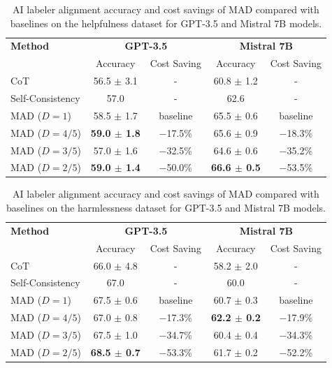 \documentclass[11pt]{article}
\begin{document}
\begin{table}
  \centering
  \begin{tabular}{l|cc|cc}
    \hline
     \textbf{Method} & \multicolumn{2}{c|}{\textbf{GPT-3.5}} & \multicolumn{2}{c}{\textbf{Mistral 7B}} \\
     & Accuracy & Cost Saving & Accuracy & Cost Saving \\
    \hline
    CoT & 56.5 $\pm$ 3.1 & - & 60.8 $\pm$ 1.2  & - \\
    Self-Consistency  & 57.0 & - & 62.6 & - \\
    \hline
    MAD ($D=1$) & 58.5 $\pm$ 1.7 & baseline & 65.5 $\pm$ 0.6 & baseline \\
    MAD ($D=4/5$) & \textbf{59.0 $\pm$ 1.8} & $-$17.5\% & 65.6 $\pm$ 0.9 & $-$18.3\% \\
    MAD ($D=3/5$) & 57.0 $\pm$ 1.6 & $-$32.5\% & 64.6 $\pm$ 0.6 & $-$35.2\% \\
    MAD ($D=2/5$) & \textbf{59.0 $\pm$ 1.4} & $-$50.0\% & \textbf{66.6 $\pm$ 0.5} & $-$53.5\% \\
    \hline
  \end{tabular}
\caption{AI labeler alignment accuracy and cost savings of MAD compared with baselines on the helpfulness dataset for GPT-3.5 and Mistral 7B models.}
\label{table:helpfulness}
\end{table}

\begin{table}
  \centering
  \begin{tabular}{l|cc|cc}
    \hline
     \textbf{Method} & \multicolumn{2}{c|}{\textbf{GPT-3.5}} & \multicolumn{2}{c}{\textbf{Mistral 7B}} \\
     & Accuracy & Cost Saving & Accuracy & Cost Saving \\
    \hline
    CoT & 66.0 $\pm$ 4.8 & - & 58.2 $\pm$ 2.0 & - \\
    Self-Consistency  & 67.0 & - & 60.0 & - \\
    \hline
    MAD ($D=1$)    & 67.5 $\pm$ 0.6 & baseline & 60.7 $\pm$ 0.3 & baseline \\
    MAD ($D=4/5$)  & 67.0 $\pm$ 0.8 &  $-$17.3\% & \textbf{62.2 $\pm$ 0.2} & $-$17.9\% \\
    MAD ($D=3/5$)  & 67.5 $\pm$ 1.0 & $-$34.7\% & 60.4 $\pm$ 0.4 & $-$34.3\% \\
    MAD ($D=2/5$)  & \textbf{68.5 $\pm$ 0.7} & $-$53.3\% & 61.7 $\pm$ 0.2  & $-$52.2\% \\
    \hline
  \end{tabular}
\caption{AI labeler alignment accuracy and cost savings of MAD compared with baselines on the harmlessness dataset for GPT-3.5 and Mistral 7B models.}
\label{table:harmlessness}
\end{table}
\end{document}
